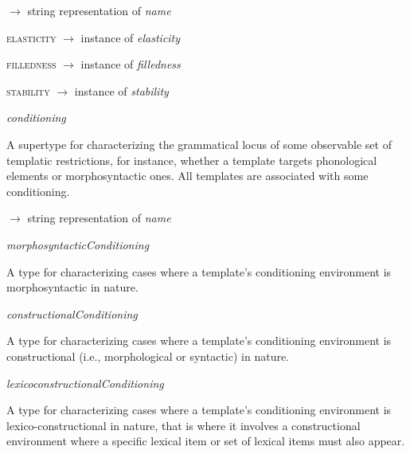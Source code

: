\begin{ontologytop}
	\begin{proplist}

	\item \textsc{\name} $\rightarrow$ string representation of \emph{name}

	\item \textsc{elasticity} $\rightarrow$ instance of \emph{elasticity}

	\item \textsc{filledness} $\rightarrow$ instance of \emph{filledness}

	\item \textsc{stability} $\rightarrow$ instance of \emph{stability}

	\end{proplist}

\item \emph{conditioning}
\hspace{1em}\parbox[t]{\linegoal}{\footnotesize A supertype for  characterizing the grammatical locus of some observable set of templatic restrictions, for instance, whether a template targets phonological elements or morphosyntactic ones. All templates are associated with some conditioning.}


	\begin{proplist}

	\item \textsc{\name} $\rightarrow$ string representation of \emph{name}

	\end{proplist}

	\begin{classlist}

	\item \emph{morphosyntacticConditioning}
	\hspace{1em}\parbox[t]{\linegoal}{\footnotesize A type for characterizing cases where a template's conditioning environment is morphosyntactic in nature.}


		\begin{classlist}

		\item \emph{constructionalConditioning}
		\hspace{1em}\parbox[t]{\linegoal}{\footnotesize A type for characterizing cases where a template's conditioning environment is constructional (i.e., morphological or syntactic) in nature.}


		\item \emph{lexicoconstructionalConditioning}
		\hspace{1em}\parbox[t]{\linegoal}{\footnotesize A type for characterizing cases where a template's conditioning environment is lexico-constructional in nature, that is where it involves a constructional environment where a specific lexical item or set of lexical items must also appear.}



\end{classlist}
\end{classlist}
\end{ontologytop}
